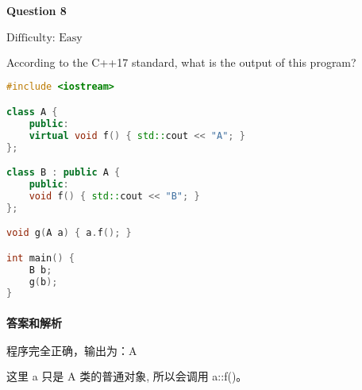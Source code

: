 \documentclass{article}
\begin{document}
	\paragraph*{Question 8} $\boxed{\text{Difficulty: Easy}} $			
	
	According to the C++17 standard, what is the output of this program?
	
	\begin{lstlisting}[language=C++]  		
#include <iostream>

class A {
	public:
	virtual void f() { std::cout << "A"; }
};

class B : public A {
	public:
	void f() { std::cout << "B"; }
};

void g(A a) { a.f(); }

int main() {
	B b;
	g(b);
}
	\end{lstlisting}
	
	\paragraph*{答案和解析} $\boxed{\text{程序完全正确，输出为：A}} $
	
	这里 a 只是 A 类的普通对象, 所以会调用 a::f()。
	
\end{document}

